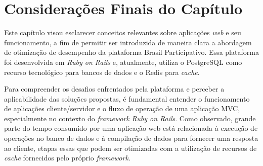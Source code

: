 \section{Considerações Finais do Capítulo}

Este capítulo visou esclarecer conceitos relevantes sobre aplicações \textit{web} e seu funcionamento, a fim de permitir ser introduzida de maneira clara a abordagem de otimização de desempenho da plataforma Brasil Participativo. Essa plataforma foi desenvolvida em \textit{Ruby on Rails} e, atualmente, utiliza o PostgreSQL como recurso tecnológico para bancos de dados e o Redis para \textit{cache}.

Para compreender os desafios enfrentados pela plataforma e perceber a aplicabilidade das soluções propostas, é fundamental entender o funcionamento de aplicações cliente/servidor e o fluxo de operação de uma aplicação MVC, especialmente no contexto do \textit{framework} \textit{Ruby on Rails}. Como observado, grande parte do tempo consumido por uma aplicação web está relacionada à execução de operações no banco de dados e à compilação de dados para fornecer uma resposta ao cliente, etapas essas que podem ser otimizadas com a utilização de recursos de \textit{cache} fornecidos pelo próprio \textit{framework}.